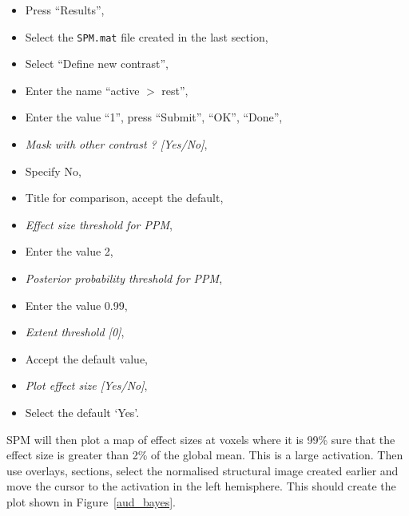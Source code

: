 \begin{itemize}
\item Press ``Results'',
\item Select the \texttt{SPM.mat} file created in the last section,
\item Select ``Define new contrast'',
\item Enter the name ``active $>$ rest'',
\item Enter the value ``1'', press ``Submit'', ``OK'', ``Done'',
\item \emph{Mask with other contrast ? [Yes/No]},
\item Specify No,
\item Title for comparison, accept the default,
\item \emph{Effect size threshold for PPM},
\item Enter the value 2,
\item \emph{Posterior probability threshold for PPM},
\item Enter the value 0.99,
\item \emph{Extent threshold [0]},
\item Accept the default value,
\item \emph{Plot effect size [Yes/No]},
\item Select the default `Yes'.
\end{itemize}

SPM will then plot a map of effect sizes at voxels where it is 99\% sure that the effect size is greater than 2\% of the global mean. This is a large activation. Then use overlays, sections, select the normalised structural image created earlier and move the cursor to the activation in the left hemisphere. This should create the plot shown in Figure~\ref{aud_bayes}.

